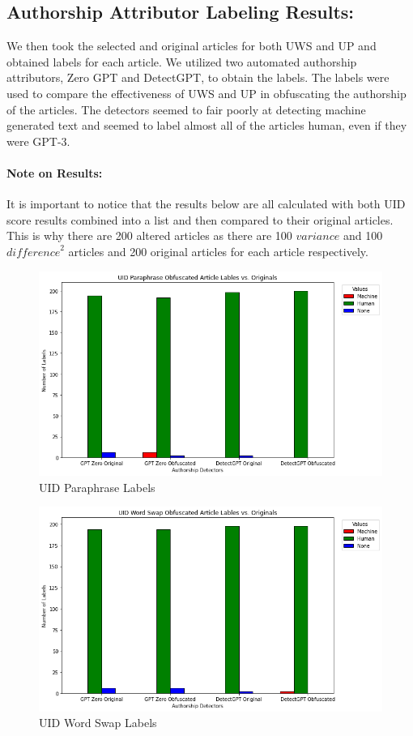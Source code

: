 \documentclass{article}
\begin{document}
\subsection{Authorship Attributor Labeling Results:}
\hfill \break
We then took the selected and original articles for both UWS and UP and obtained labels for each article. We utilized two automated authorship attributors, Zero GPT and DetectGPT, to obtain the labels. The labels were used to compare the effectiveness of UWS and UP in obfuscating the authorship of the articles. The detectors seemed to fair poorly at detecting machine generated text and seemed to label almost all of the articles human, even if they were GPT-3.


\paragraph{Note on Results:} It is important to notice that the results below are all calculated with both UID score results combined into a list and then compared to their original articles. This is why there are 200 altered articles as there are 100 $variance$ and 100 ${difference}^2$ articles and 200 original articles for each article respectively.

\begin{figure}[H]
    \centering
    \includegraphics[width=1\linewidth]{ParaphraseLabelPlot.png}
    \caption{UID Paraphrase Labels}
    \label{fig:enter-label}
\end{figure}

\begin{figure}[H]
    \centering
    \includegraphics[width=1\linewidth]{WordSwapLabelPlot.png}
    \caption{UID Word Swap Labels}
    \label{fig:enter-label}
\end{figure}
\end{document}
